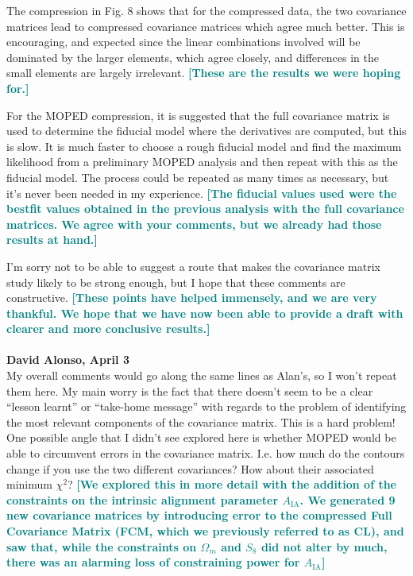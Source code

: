 \documentclass{article}
\newcommand\reply[1]{{\bf {\textcolor{teal}{[#1]}}}}
\begin{document}
	The compression in Fig. 8 shows that for the compressed data, the two covariance matrices lead to compressed covariance matrices which agree much better.  This is encouraging, and expected since the linear combinations involved will be dominated by the larger elements, which agree closely, and differences in the small elements are largely irrelevant. \reply{These are the results we were hoping for.}
	
	For the MOPED compression, it is suggested that the full covariance matrix is used to determine the fiducial model where the derivatives are computed, but this is slow. It is much faster to choose a rough fiducial model and find the maximum likelihood from a preliminary MOPED analysis and then repeat with this as the fiducial model.  The process could be repeated as many times as necessary, but it’s never been needed in my experience. \reply{The fiducial values used were the bestfit values obtained in the previous analysis with the full covariance matrices. We agree with your comments, but we already had those results at hand.}
	
	I’m sorry not to be able to suggest a route that makes the covariance matrix study likely to be strong enough, but I hope that these comments are constructive. \reply{These points have helped immensely, and we are very thankful. We hope that we have now been able to provide a draft with clearer and more conclusive results.}\\  \\
	
	
	\textbf{David Alonso, April 3} \\
	
	My overall comments would go along the same lines as Alan's, so I won't repeat them here. My main worry is the fact that there doesn't seem to be a clear “lesson learnt” or “take-home message” with regards to the problem of identifying the most relevant components of the covariance matrix. This is a hard problem! One possible angle that I didn't see explored here is whether MOPED would be able to circumvent errors in the covariance matrix. I.e. how much do the contours change if you use the two different covariances? How about their associated minimum $\chi^2$? \reply{We explored this in more detail with the addition of the constraints on the intrinsic alignment parameter $A_{\mathrm{IA}}$. We generated 9 new covariance matrices by introducing error to the compressed Full Covariance Matrix (FCM, which we previously referred to as CL), and saw that, while the constraints on $\Omega_m$ and $S_8$ did not alter by much, there was an alarming loss of constraining power for $A_{\mathrm{IA}}$}
	
\end{document}
